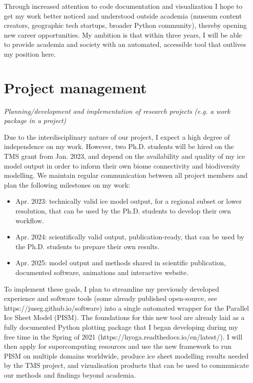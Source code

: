 \documentclass{article}
\newcommand{\guideline}[1]{{\color{color2}\itshape{#1}}}
\begin{document}
    Through increased attention to code documentation and visualization I hope
    to get my work better noticed and understood outside academia (museum
    content creators, geographic tech startups, broader Python community),
    thereby opening new career opportunities. My ambition is that within three
    years, I will be able to provide academia and society with an automated,
    accessible tool that outlives my position here.


\section{Project management}

\guideline{
    Planning/development and implementation of research projects (e.g. a work
    package in a project)}

    Due to the interdisciplinary nature of our project, I expect a high degree
    of independence on my work. However, two Ph.D. students will be hired on
    the TMS grant from Jan. 2023, and depend on the availability and quality
    of my ice model output in order to inform their own biome connectivity and
    biodiversity modelling. We maintain regular communication between all
    project members and plan the following milestones on my work:

    \begin{itemize}
      \item Apr. 2023: technically valid ice model output, for a regional
        subset or lower resolution, that can be used by the Ph.D. students to
        develop their own workflow.
      \item Apr. 2024: scientifically valid output, publication-ready, that can
        be used by the Ph.D. students to prepare their own results.
      \item Apr. 2025: model output and methods shared in scientific
        publication, documented software, animations and interactive website.
    \end{itemize}

    To implement these goals, I plan to streamline my previously developed
    experience and software tools (some already published open-source, see
    https://juseg.github.io/software) into a single automated wrapper for the
    Parallel Ice Sheet Model (PISM). The foundations for this new tool are
    already laid as a fully documented Python plotting package that I began
    developing during my free time in the Spring of 2021
    (https://hyoga.readthedocs.io/en/latest/). I will then apply for
    supercomputing resources and use the new framework to run PISM on multiple
    domains worldwide, produce ice sheet modelling results needed by the TMS
    project, and vizualisation products that can be used to communicate our
    methods and findings beyond academia.
\end{document}
